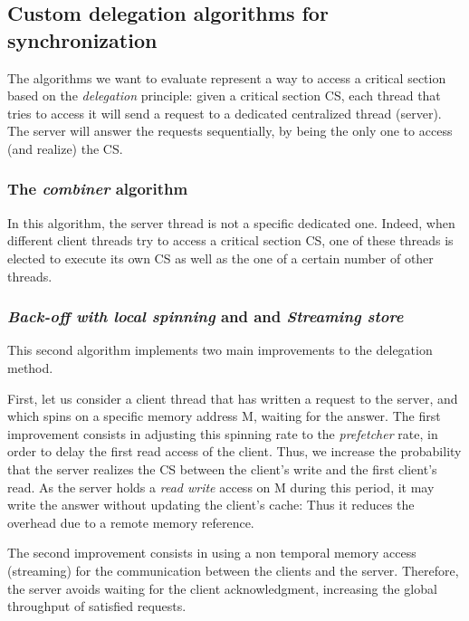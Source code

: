 \documentclass[10pt]{article}											%
\begin{document}
\subsection{Custom delegation algorithms for synchronization}\label{delegationSynchronizationAlgo_description}
The algorithms we want to evaluate\cite{delegationCS_roparsPetrovic,combinerSyhcronization_darko} represent a way to access a critical section based on the \emph{delegation} principle: given a critical section CS, each thread that tries to access it will send a request to a dedicated centralized thread (server).   The server will answer the requests sequentially, by being the only one to access (and realize) the CS.\\



\subsubsection{The \emph{combiner} algorithm}
In this algorithm, the server thread is not a specific dedicated one.   Indeed, when different client threads try to access a critical section CS, one of these threads is elected to execute its own CS as well as the one of a certain number of other threads.



\subsubsection{\emph{Back-off with local spinning} and and \emph{Streaming store}}
This second algorithm implements two main improvements to the delegation method.

First, let us consider a client thread that has written a request to the server, and which spins on a specific memory address M, waiting for the answer.   The first improvement consists in adjusting this spinning rate to the \textit{prefetcher} rate, in order to delay the first read access of the client.   Thus, we increase the probability that the server realizes the CS between the client's write and the first client's read.   As the server holds a \emph{read write} access on M during this period, it may write the answer without updating the client's cache:  Thus it reduces the overhead due to a remote memory reference.

The second improvement consists in using a non temporal memory access (streaming) for the communication between the clients and the server.   Therefore, the server avoids waiting for the client acknowledgment, increasing the global throughput of satisfied requests.
\end{document}
